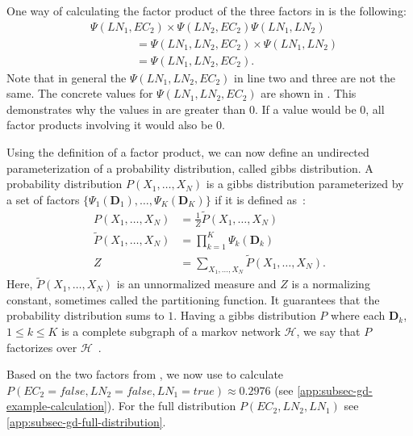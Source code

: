 One way of calculating the \gls{factor product} of the three \glspl{factor} in  is the following:
\begin{equation*}
  \begin{split}
  &\Psi(LN_1,EC_2)\times\Psi(LN_2,EC_2)\Psi(LN_1,LN_2)\\
  &\hspace{4em}=\Psi(LN_1,LN_2,EC_2)\times\Psi(LN_1,LN_2)\\
  &\hspace{4em}=\Psi(LN_1,LN_2,EC_2).
  \end{split}
\end{equation*}
Note that in general the $\Psi(LN_1,LN_2,EC_2)$ in line two and three are not the same.
The concrete values for $\Psi(LN_1,LN_2,EC_2)$ are shown in .
This demonstrates why the values in  are greater than $0$.
If a value would be $0$, all factor products involving it would also be $0$.

\bigskip

Using the definition of a \gls{factor product}, we can now define an undirected parameterization of a \gls{probability distribution}, called \gls{gibbs distribution}.
A \gls{probability distribution} $P(X_1,\dots,X_N)$ is a \gls{gibbs distribution} parameterized by a set of \glspl{factor} $\{\Psi_1(\mathbf{D}_1),\dots,\Psi_K(\mathbf{D}_K)\}$ if it is defined as~\citep{koller2009probabilistic}:
\begin{equation}
  \label{equ:gibbs-distribution}
  \begin{split}
  P\left(X_1,\dots,X_N\right) & =\frac{1}{Z}\tilde{P}\left(X_1,\dots,X_N\right) \\
  \tilde{P}\left(X_1,\dots,X_N\right) & =\prod_{k=1}^{K}\Psi_k\left(\mathbf{D}_k\right) \\
  Z & =\sum_{X_1,\ldots,X_N}\tilde{P}\left(X_1,\dots,X_N\right).
  \end{split}
\end{equation}
Here, $\tilde{P}(X_1,\dots,X_N)$ is an unnormalized measure and $Z$ is a \gls{normalizing constant}, sometimes called the \gls{partitioning function}.
It guarantees that the \gls{probability distribution} sums to $1$.
Having a \gls{gibbs distribution} $P$ where each $\mathbf{D}_k$, $1\leq k \leq K$ is a complete subgraph of a \gls{markov network} $\mathcal{H}$, we say that $P$ factorizes over $\mathcal{H}$~\citep{koller2009probabilistic}.

Based on the two \glspl{factor} from , we now use  to calculate $P(EC_2=\mathit{false},LN_2=\mathit{false},LN_1=\mathit{true})\approx 0.2976$ (see \cref{app:subsec-gd-example-calculation}).
For the full distribution $P(EC_2,LN_2,LN_1)$ see \cref{app:subsec-gd-full-distribution}.

